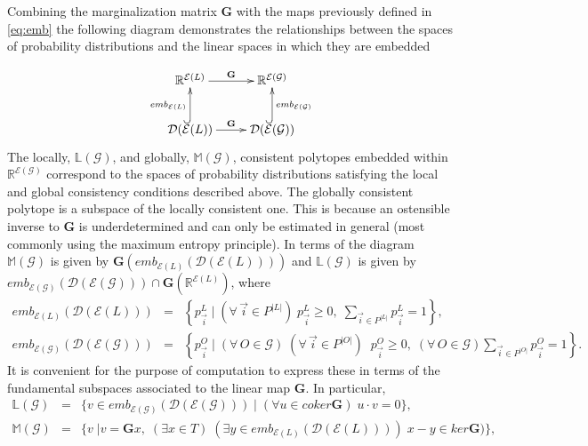 Combining the marginalization matrix $\mathbf{G}$ with the maps previously defined in \ref{eq:emb} the following diagram demonstrates the relationships between the spaces of probability distributions and the linear spaces in which they are embedded

\begin{equation*}
\xymatrix{
 \mathbb{R}^{\mathcal{E}(L)} \ar[r]^{\mathbf{G}} &
   \mathbb{R}^{\mathcal{E}(\mathcal{G})} \\
 \dist (\mathcal{E}(L)) \ar[r]^{\mathbf{G}} \ar@{^{(}->}[u]^{emb_{\mathcal{E}(L)}}& \ar@{^{(}->}[u]_{emb_{\mathcal{E}(\mathcal{G})}}
  \dist (\mathcal{E}(\mathcal{G}))
  }
\end{equation*}
The locally, $\mathbb{L}(\mathcal{G})$, and globally, $\mathbb{M}(\mathcal{G})$, consistent polytopes embedded within $\mathbb{R}^{\mathcal{E}(\mathcal{G})}$ correspond to the spaces of probability distributions satisfying the local and global consistency conditions described above. The globally consistent polytope is a subspace of the locally consistent one. This is because an ostensible inverse to $\mathbf{G}$ is underdetermined and can only be estimated in general (most commonly using the maximum entropy principle). In terms of the diagram $\mathbb{M}(\mathcal{G})$ is given by $\mathbf{G}(emb_{\mathcal{E}(L)}(\mathcal{D}(\mathcal{E}(L))))$ and $\mathbb{L}(\mathcal{G})$ is given by $emb_{\mathcal{E}(\mathcal{G})}(\mathcal{D}(\mathcal{E}(\mathcal{G}))) \cap \mathbf{G}(\mathbb{R}^{\mathcal{E}(L)})$, where
\begin{eqnarray}
emb_{\mathcal{E}(L)}(\mathcal{D}(\mathcal{E}(L))) &=& \left\{ p^L_{\vec{i}} \; \bigg| \; (\forall\, \vec{i} \in P^{|L|}) \; p^L_{\vec{i}} \geq 0, \; \sum_{\vec{i} \in P^{|L|}} p^L_{\vec{i}} = 1 \right\},\\
emb_{\mathcal{E}(\mathcal{G})}(\mathcal{D}(\mathcal{E}(\mathcal{G}))) &=& \left\{ p^{O}_{\vec{i}} \; \bigg| \; (\forall\, O \in \mathcal{G}) \; (\forall\, \vec{i} \in P^{|O|}) \;\; p^O_{\vec{i}} \geq 0, \; (\forall\, O \in \mathcal{G}) \sum_{\vec{i} \in P^{|O|}} p^{O}_{\vec{i}} = 1 \right\}.
\end{eqnarray}
It is convenient for the purpose of computation to express these in terms of the fundamental subspaces associated to the linear map $\mathbf{G}$. In particular,
\begin{eqnarray}
\mathbb{L}(\mathcal{G}) &=& \{ v \in emb_{\mathcal{E}(\mathcal{G})}(\mathcal{D}(\mathcal{E}(\mathcal{G}))) \; | \; (\forall u \in coker \mathbf{G}) \; u \cdot v = 0\},\label{eq:localpolytope}\\
\mathbb{M}(\mathcal{G}) &=& \{ v \; | v = \mathbf{G} x,\; (\exists x \in T) \; (\exists y \in emb_{\mathcal{E}(L)}(\mathcal{D}(\mathcal{E}(L))))\; x-y \in ker \mathbf{G})  \},\label{eq:globalpolytope}
\end{eqnarray}
